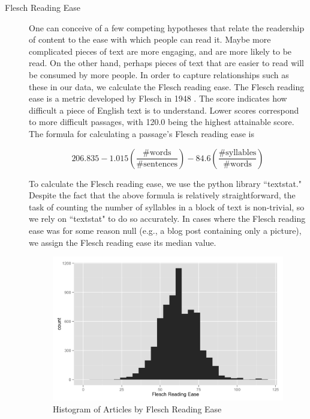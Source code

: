 \documentclass[fleqn,12pt]{SelfArx} %
\begin{document}
\begin{description}
	\item[Flesch Reading Ease] One can conceive of a few competing hypotheses that relate the readership of content to the ease with which people can read it. Maybe more complicated pieces of text are more engaging, and are more likely to be read. On the other hand, perhaps pieces of text that are easier to read will be consumed by more people. In order to capture relationships such as these in our data, we calculate the Flesch reading ease. The Flesch reading ease is a metric developed by Flesch in 1948 \cite{flesch1948new}. The score indicates how difficult a piece of English text is to understand. Lower scores correspond to more difficult passages, with 120.0 being the highest attainable score. The formula for calculating a passage's Flesch reading ease is
	
	\begin{equation}
	206.835 - 1.015 \left ( \frac{\textrm{\# words}}{\textrm{\# sentences}} \right ) - 84.6 \left ( \frac{\textrm{\# syllables}}{\textrm{\# words}} \right )
	\end{equation}
	
	To calculate the Flesch reading ease, we use the python library ``textstat." Despite the fact that the above formula is relatively straightforward, the task of counting the number of syllables in a block of text is non-trivial, so we rely on ``textstat" to do so accurately. In cases where the Flesch reading ease was for some reason null (e.g., a blog post containing only a picture), we assign the Flesch reading ease its median value.

\begin{figure}[ht]\centering
\includegraphics[width=\linewidth]{flesch_data_histogram.png}
\caption{Histogram of Articles by Flesch Reading Ease}
\label{fig:fre_hist}
\end{figure}	
	

\end{description}
\end{document}
